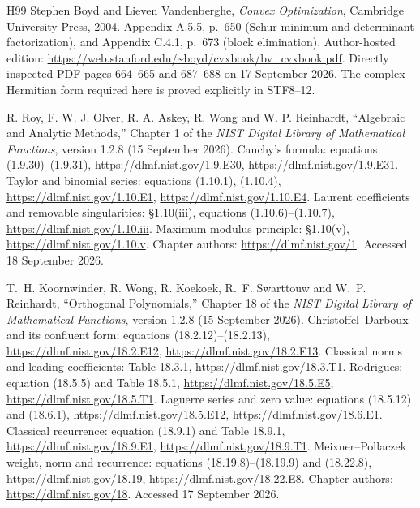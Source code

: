 \documentclass[11pt,a4paper]{article}
\begin{document}
\clearpage
\begin{thebibliography}{H99}
Stephen Boyd and Lieven Vandenberghe,
\emph{Convex Optimization}, Cambridge University Press, 2004.
Appendix A.5.5, p.~650 (Schur minimum and determinant factorization),
and Appendix C.4.1, p.~673 (block elimination).
Author-hosted edition: \url{https://web.stanford.edu/~boyd/cvxbook/bv_cvxbook.pdf}.
Directly inspected PDF pages 664--665 and 687--688 on 17 September 2026.
The complex Hermitian form required here is proved explicitly in STF8--12.


R. Roy, F. W. J. Olver, R. A. Askey, R. Wong and W. P. Reinhardt,
``Algebraic and Analytic Methods,'' Chapter 1 of the
\emph{NIST Digital Library of Mathematical Functions},
version 1.2.8 (15 September 2026).
Cauchy's formula: equations (1.9.30)--(1.9.31),
\url{https://dlmf.nist.gov/1.9.E30},
\url{https://dlmf.nist.gov/1.9.E31}.
Taylor and binomial series: equations (1.10.1), (1.10.4),
\url{https://dlmf.nist.gov/1.10.E1},
\url{https://dlmf.nist.gov/1.10.E4}.
Laurent coefficients and removable singularities: \S1.10(iii),
equations (1.10.6)--(1.10.7),
\url{https://dlmf.nist.gov/1.10.iii}.
Maximum-modulus principle: \S1.10(v),
\url{https://dlmf.nist.gov/1.10.v}.
Chapter authors: \url{https://dlmf.nist.gov/1}.
Accessed 18 September 2026.


T.~H. Koornwinder, R. Wong, R. Koekoek, R.~F. Swarttouw and
W.~P. Reinhardt,
``Orthogonal Polynomials,'' Chapter 18 of the
\emph{NIST Digital Library of Mathematical Functions},
version 1.2.8 (15 September 2026).
Christoffel--Darboux and its confluent form: equations (18.2.12)--(18.2.13),
\url{https://dlmf.nist.gov/18.2.E12},
\url{https://dlmf.nist.gov/18.2.E13}.
Classical norms and leading coefficients: Table 18.3.1,
\url{https://dlmf.nist.gov/18.3.T1}.
Rodrigues: equation (18.5.5) and Table 18.5.1,
\url{https://dlmf.nist.gov/18.5.E5},
\url{https://dlmf.nist.gov/18.5.T1}.
Laguerre series and zero value: equations (18.5.12) and (18.6.1),
\url{https://dlmf.nist.gov/18.5.E12},
\url{https://dlmf.nist.gov/18.6.E1}.
Classical recurrence: equation (18.9.1) and Table 18.9.1,
\url{https://dlmf.nist.gov/18.9.E1},
\url{https://dlmf.nist.gov/18.9.T1}.
Meixner--Pollaczek weight, norm and recurrence:
equations (18.19.8)--(18.19.9) and (18.22.8),
\url{https://dlmf.nist.gov/18.19},
\url{https://dlmf.nist.gov/18.22.E8}.
Chapter authors: \url{https://dlmf.nist.gov/18}.
Accessed 17 September 2026.



\end{thebibliography}
\end{document}
